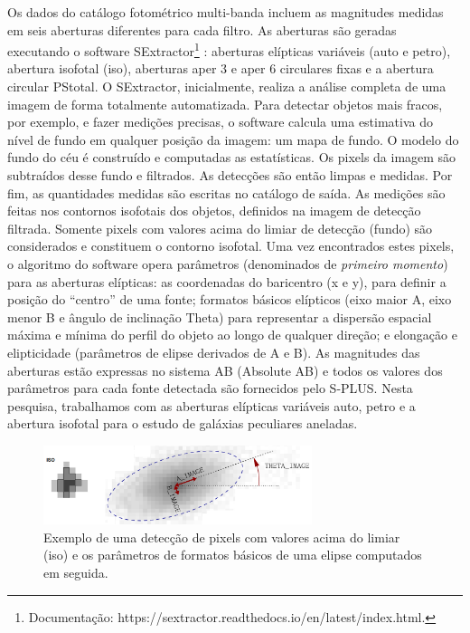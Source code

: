 Os dados do catálogo fotométrico multi-banda incluem as magnitudes medidas em seis aberturas diferentes para cada filtro. As aberturas são geradas executando o software SExtractor\footnote[10]{Documentação: https://sextractor.readthedocs.io/en/latest/index.html.} \cite{1996A&AS..117..393B}: aberturas elípticas variáveis (auto e petro), abertura isofotal (iso), aberturas aper 3 e aper 6 circulares fixas e a abertura circular PStotal. O SExtractor, inicialmente, realiza a análise completa de uma imagem de forma totalmente automatizada. Para detectar objetos mais fracos, por exemplo, e fazer medições precisas, o software calcula uma estimativa do nível de fundo em qualquer posição da imagem: um mapa de fundo. O modelo do fundo do céu é construído e computadas as estatísticas. Os pixels da imagem são subtraídos desse fundo e filtrados. As detecções são então limpas e medidas. Por fim, as quantidades medidas são escritas no catálogo de saída. As medições são feitas nos contornos isofotais dos objetos, definidos na imagem de detecção filtrada. Somente pixels com valores acima do limiar de detecção (fundo) são considerados e constituem o contorno isofotal. Uma vez encontrados estes pixels, o algoritmo do software opera parâmetros (denominados de \emph{primeiro momento}) para as aberturas elípticas: as coordenadas do baricentro (x e y), para definir a posição do ``centro'' de uma fonte; formatos básicos elípticos (eixo maior A, eixo menor B e ângulo de inclinação Theta) para representar a dispersão espacial máxima e mínima do perfil do objeto ao longo de qualquer direção; e elongação e elipticidade (parâmetros de elipse derivados de A e B). As magnitudes das aberturas estão expressas no sistema AB (Absolute AB) e todos os valores dos parâmetros para cada fonte detectada são fornecidos pelo S-PLUS. Nesta pesquisa, trabalhamos com as aberturas elípticas variáveis auto, petro e a abertura isofotal para o estudo de galáxias peculiares aneladas.

\begin{figure}[h]
  \centering 
  \includegraphics[width=0.7\textwidth]{Imagens/iso_elipse.png} 
  \caption[Detecção de uma fonte e parâmetros da elipse.]{Exemplo de uma detecção de pixels com valores acima do limiar (iso) e os parâmetros de formatos básicos de uma elipse computados em seguida.}
  \label{fig:iso_elipse} 
\end{figure}

